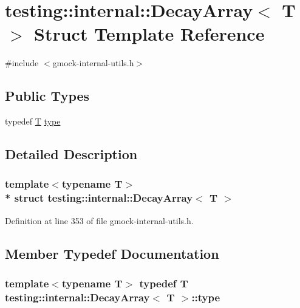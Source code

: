 \hypertarget{structtesting_1_1internal_1_1_decay_array}{}\section{testing\+:\+:internal\+:\+:Decay\+Array$<$ T $>$ Struct Template Reference}
\label{structtesting_1_1internal_1_1_decay_array}


{\ttfamily \#include $<$gmock-\/internal-\/utils.\+h$>$}

\subsection*{Public Types}
\begin{DoxyCompactItemize}
\item 
typedef \hyperlink{functions__7_8js_adf1f3edb9115acb0a1e04209b7a9937b}{T} \hyperlink{structtesting_1_1internal_1_1_decay_array_a39803f9bafd56bc4531f86eb34fe9c0f}{type}
\end{DoxyCompactItemize}


\subsection{Detailed Description}
\subsubsection*{template$<$typename T$>$\\*
struct testing\+::internal\+::\+Decay\+Array$<$ T $>$}



Definition at line 353 of file gmock-\/internal-\/utils.\+h.



\subsection{Member Typedef Documentation}
\subsubsection[{\texorpdfstring{type}{type}}]{\setlength{\rightskip}{0pt plus 5cm}template$<$typename T$>$ typedef {\bf T} {\bf testing\+::internal\+::\+Decay\+Array}$<$ {\bf T} $>$\+::{\bf type}}\hypertarget{structtesting_1_1internal_1_1_decay_array_a39803f9bafd56bc4531f86eb34fe9c0f}{}\label{structtesting_1_1internal_1_1_decay_array_a39803f9bafd56bc4531f86eb34fe9c0f}


